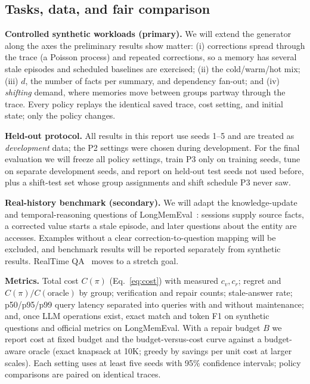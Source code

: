 \documentclass{article}
\begin{document}
\subsection{Tasks, data, and fair comparison}
\textbf{Controlled synthetic workloads (primary).} We will extend the generator
along the axes the preliminary results show matter: (i) corrections spread
through the trace (a Poisson process) and repeated corrections, so a memory
has several stale episodes and scheduled baselines are exercised; (ii) the
cold/warm/hot mix; (iii) $d$, the number of facts per summary, and dependency
fan-out; and (iv) \emph{shifting} demand, where memories move between groups
partway through the trace. Every policy replays the identical saved trace, cost
setting, and initial state; only the policy changes.

\textbf{Held-out protocol.} All results in this report use seeds 1--5 and are
treated as \emph{development} data; the P2 settings were chosen during
development. For the final evaluation we will freeze all policy settings,
train P3 only on training seeds, tune on separate development seeds, and report
on held-out test seeds not used before, plus a shift-test set whose group
assignments and shift schedule P3 never saw.

\textbf{Real-history benchmark (secondary).} We will adapt the knowledge-update
and temporal-reasoning questions of LongMemEval~\citep{wu2025longmemeval}:
sessions supply source facts, a corrected value starts a stale episode, and
later questions about the entity are accesses. Examples without a clear
correction-to-question mapping will be excluded, and benchmark results will
be reported separately from synthetic results. RealTime QA~\citep{kasai2023realtimeqa}
moves to a stretch goal.

\textbf{Metrics.} Total cost $C(\pi)$ (Eq.~\ref{eq:cost}) with measured
$c_v,c_r$; regret and $C(\pi)/C(\mathrm{oracle})$ by group; verification and
repair counts; stale-answer rate; p50/p95/p99 query latency separated into
queries with and without maintenance; and, once LLM operations exist, exact
match and token F1 on synthetic questions and official metrics on LongMemEval.
With a repair budget $B$ we report cost at fixed budget and the
budget-versus-cost curve against a budget-aware oracle (exact knapsack at 10K;
greedy by savings per unit cost at larger scales). Each setting uses at least
five seeds with 95\% confidence intervals; policy comparisons are paired on
identical traces.
\end{document}
